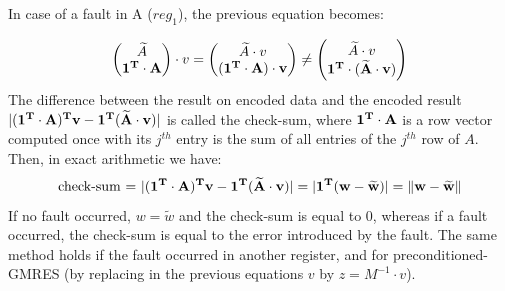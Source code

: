 In case of a fault in A ($reg_1$), the previous equation becomes:

\begin{equation}
%
    \begin{pmatrix}
        \widetilde{A}  \\
        \allOne^T \cdot A 
     \end{pmatrix} \cdot
	v
    =  \begin{pmatrix}
        \widetilde{A} \cdot v \\
        (\allOne^T \cdot A) \cdot v
     \end{pmatrix} 
    \neq  \begin{pmatrix}
        \widetilde{A} \cdot v \\
        \allOne^T \cdot (\widetilde{A} \cdot v)
     \end{pmatrix} 
%
\end{equation}
The difference between the result on encoded data and the encoded result $|(\bf{1}^T \cdot A)^T v - \bf{1}^T (\widetilde{A} \cdot v)|$ is called the check-sum,
where $\bf{1}^T \cdot A$ is a row vector computed once with  its $j^{th}$ entry is the sum of all entries of the $j^{th}$ row of $A$.
Then, in exact arithmetic we have: 
\begin{equation} \label{eqn:checksum}
 \text{check-sum = } |(\bf{1}^T \cdot A)^T  v - \bf{1}^T (\widetilde{A} \cdot v)| = |\bf{1}^T (w-\widetilde{w})| = \|w - \widetilde{w}\|
\end{equation}
 If no fault occurred, $w = \widetilde{w}$ and the check-sum is equal to 0, whereas if a fault occurred, the check-sum is equal to the error introduced by the fault. The same method holds if the fault occurred in another register, and for preconditioned-GMRES (by replacing in the previous equations $v$ by $z = M^{-1} \cdot v$). 

